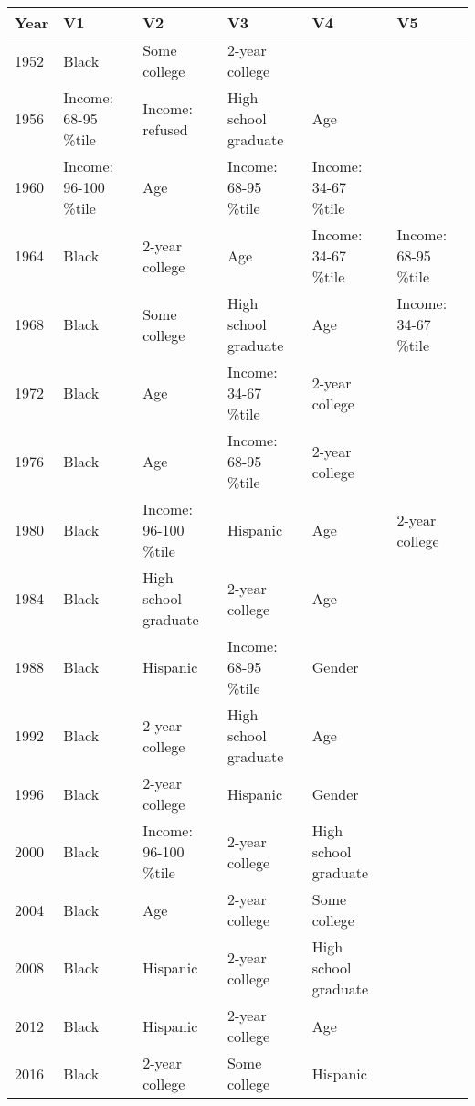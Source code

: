 \begin{tabular}{llllll}
  \toprule
Year & V1 & V2 & V3 & V4 & V5 \\ 
  \midrule
1952 & Black & Some college & 2-year college &  &  \\ 
  1956 & Income: 68-95 \%tile & Income: refused & High school graduate & Age &  \\ 
  1960 & Income: 96-100 \%tile & Age & Income: 68-95 \%tile & Income: 34-67 \%tile &  \\ 
  1964 & Black & 2-year college & Age & Income: 34-67 \%tile & Income: 68-95 \%tile \\ 
  1968 & Black & Some college & High school graduate & Age & Income: 34-67 \%tile \\ 
  1972 & Black & Age & Income: 34-67 \%tile & 2-year college &  \\ 
  1976 & Black & Age & Income: 68-95 \%tile & 2-year college &  \\ 
  1980 & Black & Income: 96-100 \%tile & Hispanic & Age & 2-year college \\ 
  1984 & Black & High school graduate & 2-year college & Age &  \\ 
  1988 & Black & Hispanic & Income: 68-95 \%tile & Gender &  \\ 
  1992 & Black & 2-year college & High school graduate & Age &  \\ 
  1996 & Black & 2-year college & Hispanic & Gender &  \\ 
  2000 & Black & Income: 96-100 \%tile & 2-year college & High school graduate &  \\ 
  2004 & Black & Age & 2-year college & Some college &  \\ 
  2008 & Black & Hispanic & 2-year college & High school graduate &  \\ 
  2012 & Black & Hispanic & 2-year college & Age &  \\ 
  2016 & Black & 2-year college & Some college & Hispanic &  \\ 
   \bottomrule
\end{tabular}
